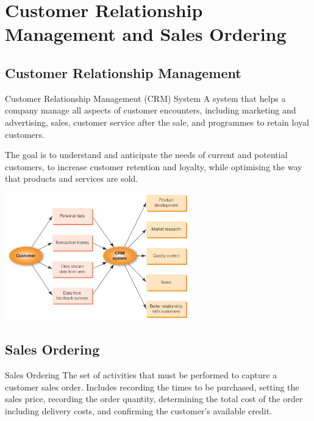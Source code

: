 \documentclass[\main/notes.tex]{subfiles}
\begin{document}
		\section{Customer Relationship Management and Sales Ordering}
			\subsection{Customer Relationship Management}
				\begin{definition}{Customer Relationship Management (CRM) System}
					A system that helps a company manage all aspects of customer encounters, including marketing and advertising, sales, customer service after the sale, and programmes to retain loyal customers.

					The goal is to understand and anticipate the needs of current and potential customers, to increase customer retention and loyalty, while optimising the way that products and services are sold.
					\begin{center}
						\includegraphics[width=0.6\textwidth]{chapter07/customer_relationship.png}
					\end{center}
				\end{definition}
			\subsection{Sales Ordering}
				\begin{definition}{Sales Ordering}
					The set of activities that must be performed to capture a customer sales order. Includes recording the times to be purchased, setting the sales price, recording the order quantity, determining the total cost of the order including delivery costs, and confirming the customer's available credit.
				\end{definition}
	\vbox{}
\end{document}

